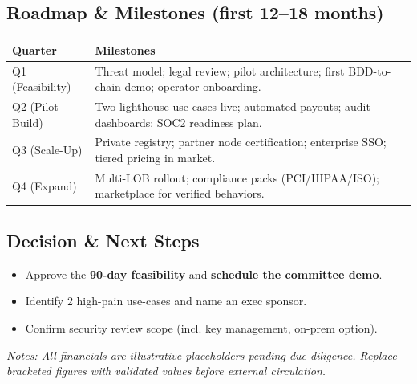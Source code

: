 \documentclass[11pt]{article}
\begin{document}
\subsection*{Roadmap \& Milestones (first 12--18 months)}
\noindent\begin{tabularx}{\linewidth}{@{}lX@{}}
\toprule
\textbf{Quarter} & \textbf{Milestones} \\
\midrule
Q1 (Feasibility) & Threat model; legal review; pilot architecture; first BDD-to-chain demo; operator onboarding. \\
Q2 (Pilot Build) & Two lighthouse use-cases live; automated payouts; audit dashboards; SOC2 readiness plan. \\
Q3 (Scale-Up) & Private registry; partner node certification; enterprise SSO; tiered pricing in market. \\
Q4 (Expand) & Multi-LOB rollout; compliance packs (PCI/HIPAA/ISO); marketplace for verified behaviors. \\
\bottomrule
\end{tabularx}

\subsection*{Decision \& Next Steps}
\begin{itemize}
  \item Approve the \textbf{90-day feasibility} and \textbf{schedule the committee demo}.\\
  \item Identify 2 high-pain use-cases and name an exec sponsor.\\
  \item Confirm security review scope (incl. key management, on-prem option).
\end{itemize}

\vfill
\noindent\footnotesize\textit{Notes: All financials are illustrative placeholders pending due diligence. Replace bracketed figures with validated values before external circulation.}\par
\end{document}
